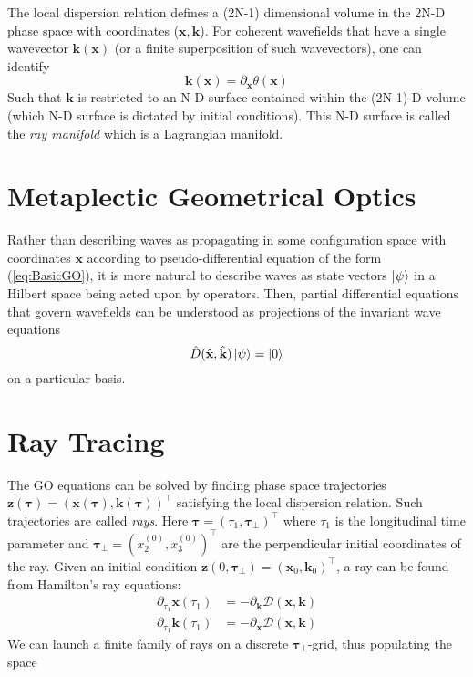\documentclass{article}
\begin{document}
The local dispersion relation defines a (2N-1) dimensional
volume in the 2N-D phase space with coordinates ($\mathbf{x},\mathbf{k}$). For coherent wavefields that have a single wavevector $\mathbf{k}(\mathbf{x})$ (or a finite superposition of such wavevectors), one can identify
\begin{equation}
    \mathbf{k}(\mathbf{x}) = \partial_\mathbf{x}\theta(\mathbf{x})
\end{equation}
Such that $\mathbf{k} $ is restricted to an N-D surface
contained within the (2N-1)-D volume (which N-D surface is
dictated by initial conditions). This N-D surface is called
the \textit{ray manifold} which is a Lagrangian manifold.
\section{Metaplectic Geometrical Optics}
Rather than describing waves as propagating in some
configuration space with coordinates $\mathbf{x}$ according to
pseudo-differential equation of the form (\ref{eq:BasicGO}), it
is more natural to describe waves as state vectors $\ket{\psi}$
in a Hilbert space being acted upon by operators. Then, partial
differential equations that govern wavefields can be understood
as projections of the invariant wave equations 
\begin{equation}
    \hat{D}(\hat{\mathbf{x}},\hat{\mathbf{k}})\ket{\psi} = \ket{0}
\end{equation}
on a particular basis.

\section{Ray Tracing}
The GO equations can be solved by finding phase space trajectories
$\mathbf{z}(\mathbf{\tau}) = (\mathbf{x}(\mathbf{\tau}),\mathbf{k}(\mathbf{\tau}))^\intercal$ satisfying the local dispersion  relation. Such trajectories are called \textit{rays}.
Here $\mathbf{\tau} = (\tau_1,\mathbf{\tau}_\perp)^\intercal$ where $\tau_1$ is the longitudinal time parameter and $\mathbf{\tau}_\perp = (x_2^ {(0)},x_3^ {(0)})^\intercal$ are the perpendicular initial coordinates of the ray.
Given an initial condition $\mathbf{z}(0,\mathbf{\tau}_\perp) = (\mathbf{x}_0,\mathbf{k}_0)^\intercal$, a ray can be found from Hamilton's ray equations:
\begin{eqnarray}
    \partial_{\tau_1}\mathbf{x}(\tau_1) &= -\partial_{\mathbf{k}}\mathcal{D}(\mathbf{x},\mathbf{k})\\
    \partial_{\tau_1}\mathbf{k}(\tau_1) &= -\partial_{\mathbf{x}}\mathcal{D}(\mathbf{x},\mathbf{k})
\end{eqnarray}
We can launch a finite family of rays on a discrete $\mathbf{\tau}_\perp$-grid,
thus populating the space
\appendix
\end{document}
